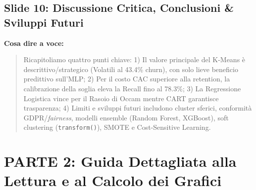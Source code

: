 \documentclass[11pt, a4paper]{article}
\begin{document}
\subsection*{Slide 10: Discussione Critica, Conclusioni \& Sviluppi Futuri}
\noindent \textbf{Cosa dire a voce:}
\begin{quote}
Ricapitoliamo quattro punti chiave: 1) Il valore principale del K-Means è descrittivo/strategico (Volatili al 43.4\% churn), con solo lieve beneficio predittivo sull'MLP; 2) Per il costo CAC superiore alla retention, la calibrazione della soglia eleva la Recall fino al 78.3\%; 3) La Regressione Logistica vince per il Rasoio di Occam mentre CART garantisce trasparenza; 4) Limiti e sviluppi futuri includono cluster sferici, conformità GDPR/\textit{fairness}, modelli ensemble (Random Forest, XGBoost), soft clustering (\texttt{transform()}), SMOTE e Cost-Sensitive Learning.
\end{quote}

\newpage

\section*{PARTE 2: Guida Dettagliata alla Lettura e al Calcolo dei Grafici}
\end{document}
